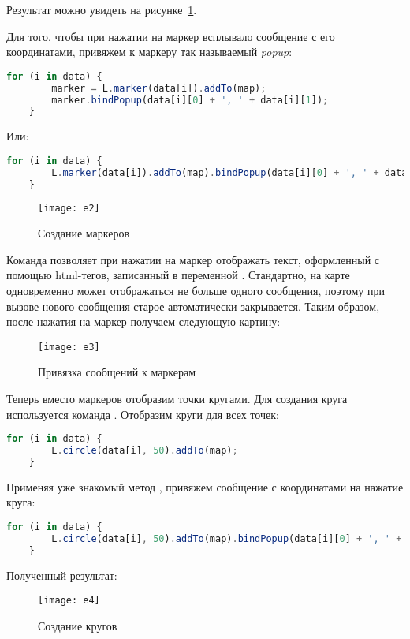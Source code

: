 Результат можно увидеть на рисунке~\ref{pic:e2}.

Для того, чтобы при нажатии на маркер всплывало сообщение с его координатами, 
привяжем к маркеру так называемый \emph{popup}:
\begin{lstlisting}[language=js]
    for (i in data) {
        marker = L.marker(data[i]).addTo(map);
        marker.bindPopup(data[i][0] + ', ' + data[i][1]);
    }
\end{lstlisting}
Или:
\begin{lstlisting}[language=js]
    for (i in data) {
        L.marker(data[i]).addTo(map).bindPopup(data[i][0] + ', ' + data[i][1]);
    }
\end{lstlisting}

\begin{figure}[h!]
    \center
    \texttt{[image: e2]}
    \caption{Создание маркеров}
    \label{pic:e2}
\end{figure}

Команда  позволяет при нажатии на маркер отображать 
текст, оформленный с помощью html-тегов, записанный в переменной 
. Стандартно, на карте одновременно может отображаться не 
больше одного сообщения, поэтому при вызове нового сообщения старое 
автоматически закрывается. Таким образом, после нажатия на маркер получаем 
следующую картину: 
\begin{figure}[ht!]
    \center
    \texttt{[image: e3]}
    \caption{Привязка сообщений к маркерам}
\end{figure}

Теперь вместо маркеров отобразим точки кругами. Для создания круга 
используется команда . Отобразим 
круги для всех точек:
\begin{lstlisting}[language=js]
    for (i in data) {
        L.circle(data[i], 50).addTo(map);
    }
\end{lstlisting}
Применяя уже знакомый метод , привяжем сообщение с 
координатами на нажатие круга:
\begin{lstlisting}[language=js]
    for (i in data) {
        L.circle(data[i], 50).addTo(map).bindPopup(data[i][0] + ', ' + data[i][1]);
    }
\end{lstlisting}

Полученный результат:
\begin{figure}[ht!]
    \center
    \texttt{[image: e4]}
    \caption{Создание кругов}
    \label{pic:e4}
\end{figure}


